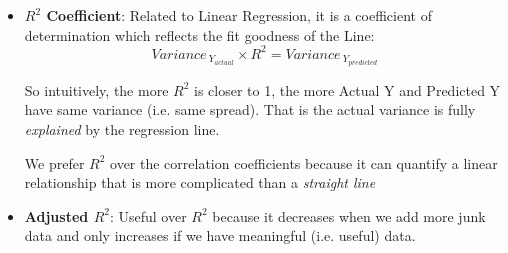 \documentclass[11pt, twocolumn]{article}
\begin{document}
\begin{itemize}
\item \textbf{$R^2$ Coefficient}: Related to Linear Regression, it is a coefficient of determination which reflects the fit goodness of the Line:
$$Variance_{~Y_{actual}} \times R^2 = Variance_{~Y_{predicted}}$$

So intuitively, the more $R^2$ is closer to 1, the more Actual Y and Predicted Y have {\color{blue}same variance} (i.e. same spread). That is the {\color{blue}actual variance is fully \textit{explained}} by the regression line.

We prefer $R^2$ over the correlation coefficients because it can quantify a linear relationship that is more {\color{blue} complicated} than a \textit{straight line}  
\end{itemize}

\begin{itemize}
\item \textbf{Adjusted $R^2$}: Useful over $R^2$ because it decreases when we add more {\color{red} junk} data and only increases if we have {\color{blue}meaningful} (i.e. useful) data.
\end{itemize}
\end{document}
